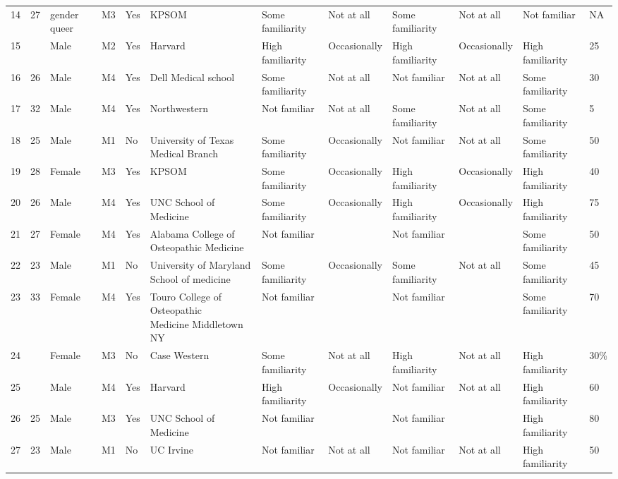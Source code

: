 \documentclass[11pt]{article}
\begin{document}
\begin{landscape}
{\begin{longtable}{rlllllllllll}
14 & 27 & gender queer & M3 & Yes & KPSOM & Some familiarity & Not at all & Some familiarity & Not at all & Not familiar & NA \\
15 & \multicolumn{1}{l}{} & Male & M2 & Yes & Harvard & High familiarity & Occasionally & High familiarity & Occasionally & High familiarity & 25 \\
16 & 26 & Male & M4 & Yes & Dell Medical school & Some familiarity & Not at all & Not familiar & Not at all & Some familiarity & 30 \\
17 & 32 & Male & M4 & Yes & Northwestern & Not familiar & Not at all & Some familiarity & Not at all & Some familiarity & 5 \\
18 & 25 & Male & M1 & No & University of Texas Medical Branch & Some familiarity & Occasionally & Not familiar & Not at all & Some familiarity & 50 \\
19 & 28 & Female & M3 & Yes & KPSOM & Some familiarity & Occasionally & High familiarity & Occasionally & High familiarity & 40 \\
20 & 26 & Male & M4 & Yes & UNC School of Medicine & Some familiarity & Occasionally & High familiarity & Occasionally & High familiarity & 75 \\
21 & 27 & Female & M4 & Yes & \makecell[l]{Alabama College of\\ Osteopathic Medicine} & Not familiar &  & Not familiar &  & Some familiarity & 50 \\
22 & 23 & Male & M1 & No & \makecell[l]{University of Maryland \\School of medicine} & Some familiarity & Occasionally & Some familiarity & Not at all & Some familiarity & 45 \\
23 & 33 & Female & M4 & Yes & \makecell[l]{Touro College of Osteopathic\\ Medicine Middletown NY} & Not familiar &  & Not familiar &  & Some familiarity & 70 \\
24 & \multicolumn{1}{l}{} & Female & M3 & No & Case Western & Some familiarity & Not at all & High familiarity & Not at all & High familiarity & 30\% \\
25 & \multicolumn{1}{l}{} & Male & M4 & Yes & Harvard & High familiarity & Occasionally & Not familiar & Not at all & High familiarity & 60 \\
26 & 25 & Male & M3 & Yes & UNC School of Medicine & Not familiar &  & Not familiar &  & High familiarity & 80 \\
27 & 23 & Male & M1 & No & UC Irvine & Not familiar & Not at all & Not familiar & Not at all & High familiarity & 50 \\

\end{longtable}}
\end{landscape}
\end{document}
